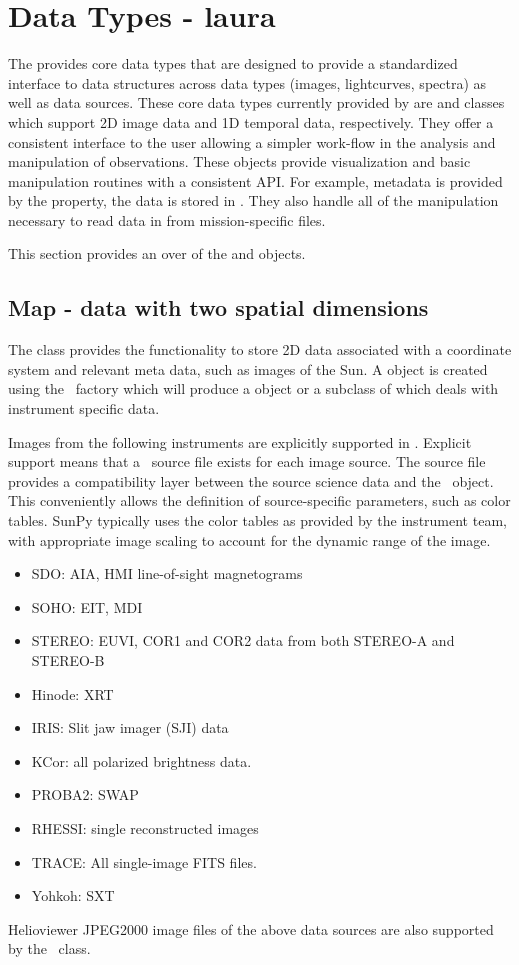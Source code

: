 \section{Data Types - laura}
The \sunpypkg provides core data types that are designed to provide a standardized interface to data structures across data types (images, lightcurves, spectra) as well as data sources. These core data types currently provided by \sunpypkg are \Map and \Timeseries classes which support 2D image data and 1D temporal data, respectively. They offer a consistent interface to the user allowing a simpler work-flow in the analysis and manipulation of observations. These objects provide visualization and basic manipulation routines with a consistent API. For example, metadata is provided by the  property, the data is stored in . They also handle all of the manipulation necessary to read data in from mission-specific files.

This section provides an over of the \Map and \Timeseries objects. 

\subsection{Map - data with two spatial dimensions}
The \Map class provides the functionality to store 2D data associated with a coordinate system and relevant meta data, such as images of the Sun. A \Map object is created using the \Map\ factory which will produce a \GenericMap object or a subclass of \GenericMap which deals with instrument specific data. 






Images from the following instruments are explicitly supported in \sunpypkg. Explicit support means that a \Map\ source file exists for each image source.  The source file provides a compatibility layer between the source science data and the \Map\ object.  This conveniently allows the definition of source-specific parameters, such as color tables. SunPy typically uses the color tables as provided by the instrument team, with appropriate image scaling to account for the dynamic range of the image.
\begin{itemize}
    \item SDO: AIA, HMI line-of-sight magnetograms
    \item SOHO: EIT, MDI
    \item STEREO: EUVI, COR1 and COR2 data from both STEREO-A and STEREO-B
    \item Hinode: XRT
    \item IRIS: Slit jaw imager (SJI) data
    \item KCor: all polarized brightness data.
    \item PROBA2: SWAP
    \item RHESSI: single reconstructed images
    \item TRACE: All single-image FITS files.
    \item Yohkoh: SXT
\end{itemize}
Helioviewer JPEG2000 image files of the above data sources are also supported by the \Map\ class.

